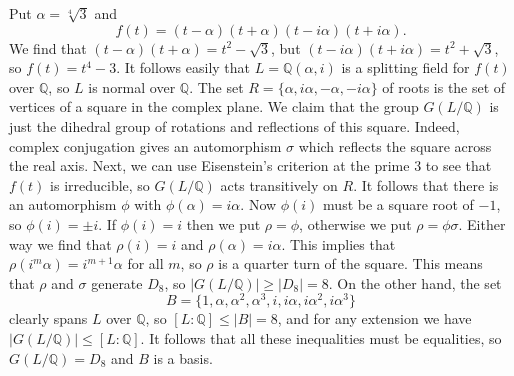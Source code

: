 \documentclass{amsart}
\newcommand{\Q}         {{\mathbb{Q}}}
\newcommand{\al}        {\alpha}
\newcommand{\sg}        {\sigma}
\renewcommand{\:}{\colon}
\newenvironment{solution}{\SolutionInline}{\endSolutionInline}
\theoremstyle{definition}
\renewenvironment{solution}{\SolutionAtEnd}{\endSolutionAtEnd}
\begin{document}
\begin{solution}
 Put $\al=\sqrt[4]{3}$ and 
 \[ f(t) = (t-\al)(t+\al)(t-i\al)(t+i\al). \]
 We find that $(t-\al)(t+\al)=t^2-\sqrt{3}$, but
 $(t-i\al)(t+i\al)=t^2+\sqrt{3}$, so $f(t)=t^4-3$.  It follows easily
 that $L=\Q(\al,i)$ is a splitting field for $f(t)$ over $\Q$, so $L$
 is normal over $\Q$.  The set $R=\{\al,i\al,-\al,-i\al\}$ of roots is
 the set of vertices of a square in the complex plane.  We claim that
 the group $G(L/\Q)$ is just the dihedral group of rotations and
 reflections of this square.  Indeed, complex conjugation gives an
 automorphism $\sg$ which reflects the square across the real axis.
 Next, we can use Eisenstein's criterion at the prime $3$ to see that
 $f(t)$ is irreducible, so $G(L/\Q)$ acts transitively on $R$.  It
 follows that there is an automorphism $\phi$ with $\phi(\al)=i\al$.
 Now $\phi(i)$ must be a square root of $-1$, so $\phi(i)=\pm i$.  If
 $\phi(i)=i$ then we put $\rho=\phi$, otherwise we put
 $\rho=\phi\sg$.  Either way we find that $\rho(i)=i$ and
 $\rho(\al)=i\al$.  This implies that $\rho(i^m\al)=i^{m+1}\al$ for
 all $m$, so $\rho$ is a quarter turn of the square.  This means that
 $\rho$ and $\sg$ generate $D_8$, so $|G(L/\Q)|\geq|D_8|=8$.  On the
 other hand, the set  
 \[ B = \{1,\al,\al^2,\al^3,i,i\al,i\al^2,i\al^3\} \]
 clearly spans $L$ over $\Q$, so $[L:\Q]\leq |B|=8$, and for any
 extension we have $|G(L/\Q)|\leq [L:\Q]$.  It follows that all these
 inequalities must be equalities, so $G(L/\Q)=D_8$ and $B$ is a basis.
 \begin{center}
 \end{center}
\end{solution}
\end{document}
